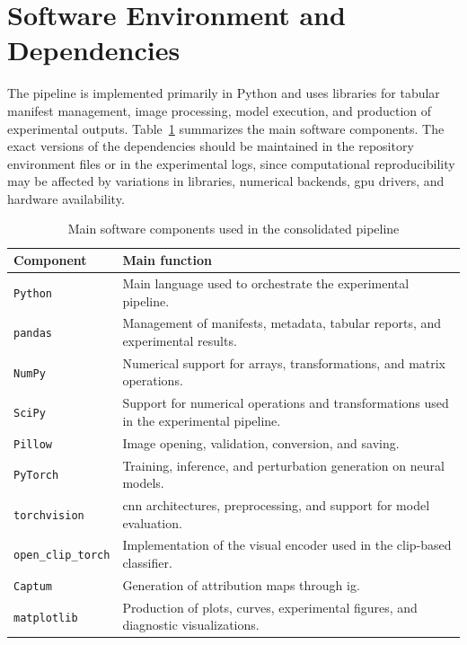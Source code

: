 \section{Software Environment and Dependencies}
\label{app:software-environment}

The pipeline is implemented primarily in Python and uses libraries for tabular
manifest management, image processing, model execution, and production of
experimental outputs. Table~\ref{tab:software-environment} summarizes the main
software components. The exact versions of the dependencies should be maintained
in the repository environment files or in the experimental logs, since
computational reproducibility may be affected by variations in libraries,
numerical backends, \gls{gpu} drivers, and hardware availability.

\begin{table}[H]
\centering
\caption{Main software components used in the consolidated pipeline}
\label{tab:software-environment}
\begin{tabularx}{\textwidth}{@{}lX@{}}
\toprule
\textbf{Component} & \textbf{Main function} \\
\midrule
\texttt{Python} & Main language used to orchestrate the experimental pipeline. \\
\texttt{pandas} & Management of manifests, metadata, tabular reports, and experimental results. \\
\texttt{NumPy} & Numerical support for arrays, transformations, and matrix operations. \\
\texttt{SciPy} & Support for numerical operations and transformations used in the experimental pipeline. \\
\texttt{Pillow} & Image opening, validation, conversion, and saving. \\
\texttt{PyTorch} & Training, inference, and perturbation generation on neural models. \\
\texttt{torchvision} & \gls{cnn} architectures, preprocessing, and support for model evaluation. \\
\texttt{open\_clip\_torch} & Implementation of the visual encoder used in the \gls{clip}-based classifier. \\
\texttt{Captum} & Generation of attribution maps through \gls{ig}. \\
\texttt{matplotlib} & Production of plots, curves, experimental figures, and diagnostic visualizations. \\
\bottomrule
\end{tabularx}
\end{table}

